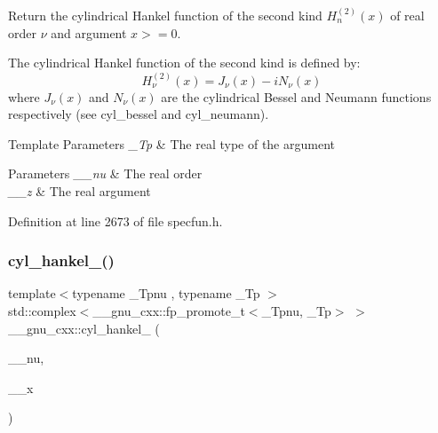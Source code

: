 Return the cylindrical Hankel function of the second kind $ H^{(2)}_n(x) $ of real order $ \nu $ and argument $ x >= 0 $.

The cylindrical Hankel function of the second kind is defined by\+: \[ H^{(2)}_\nu(x) = J_\nu(x) - iN_\nu(x) \] where $ J_\nu(x) $ and $ N_\nu(x) $ are the cylindrical Bessel and Neumann functions respectively (see cyl\+\_\+bessel and cyl\+\_\+neumann).


\begin{DoxyTemplParams}{Template Parameters}
{\em \+\_\+\+Tp} & The real type of the argument \\
\hline
\end{DoxyTemplParams}

\begin{DoxyParams}{Parameters}
{\em \+\_\+\+\_\+nu} & The real order \\
\hline
{\em \+\_\+\+\_\+z} & The real argument \\
\hline
\end{DoxyParams}


Definition at line 2673 of file specfun.\+h.

\mbox{\label{group__gnu__math__spec__func_ga326764c0d2dca072c411573503968e50}} 
\subsubsection{\texorpdfstring{cyl\+\_\+hankel\+\_()}{cyl\_hankel\_2()}\hspace{0.1cm}{\footnotesize\ttfamily [2/2]}}
{\footnotesize\ttfamily template$<$typename \+\_\+\+Tpnu , typename \+\_\+\+Tp $>$ \\
std\+::complex$<$\+\_\+\+\_\+gnu\+\_\+cxx\+::fp\+\_\+promote\+\_\+t$<$\+\_\+\+Tpnu, \+\_\+\+Tp$>$ $>$ \+\_\+\+\_\+gnu\+\_\+cxx\+::cyl\+\_\+hankel\+\_ (\begin{DoxyParamCaption}\item[{std\+::complex$<$ \+\_\+\+Tpnu $>$}]{\+\_\+\+\_\+nu,  }\item[{std\+::complex$<$ \+\_\+\+Tp $>$}]{\+\_\+\+\_\+x }\end{DoxyParamCaption})\hspace{0.3cm}{\ttfamily [inline]}}

